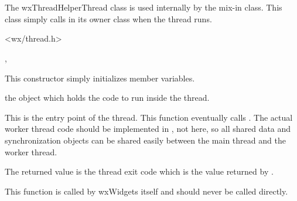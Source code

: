 \section{}\label{wxThreadHelperThread}

The wxThreadHelperThread class is used internally by the
 mix-in class.  This class simply
calls  in its owner class
when the thread runs.




<wx/thread.h>


, 


\label{wxthreadhelperthreadctor}


This constructor simply initializes member variables.



the  object which holds the code to
run inside the thread.

\label{wxthreadhelperthreadentry}


This is the entry point of the thread.  This function eventually calls
.  The actual worker
thread code should be implemented in
, not here, so all
shared data and synchronization objects can be shared easily between the
main thread and the worker thread.

The returned value is the thread exit code which is the value returned by
.

This function is called by wxWidgets itself and should never be called
directly.

\label{wxthreadhelperthreadcallentry}

